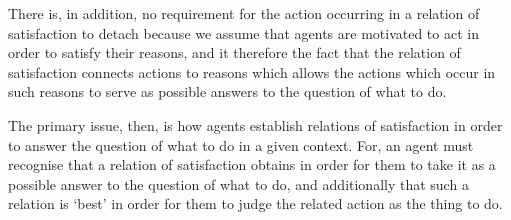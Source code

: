 \documentclass[10pt]{article}
\begin{document}



There is, in addition, no requirement for the action occurring in a relation of satisfaction to detach because we assume that agents are motivated to act in order to satisfy their reasons, and it therefore the fact that the relation of satisfaction connects actions to reasons which allows the actions which occur in such reasons to serve as possible answers to the question of what to do.

The primary issue, then, is how agents establish relations of satisfaction in order to answer the question of what to do in a given context.
For, an agent must recognise that a relation of satisfaction obtains in order for them to take it as a possible answer to the question of what to do, and additionally that such a relation is `best' in order for them to judge the related action as the thing to do.
\end{document}
